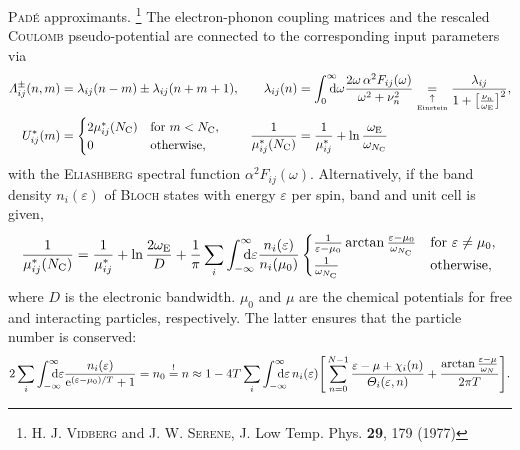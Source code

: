 \documentclass[a4paper]{article}
\def\D{\mathrm d}
\def\E{\mathrm e}
\def\sub#1{\sb{\mathrm{#1}}}
\def\from#1{\sb{\mathrlap{#1}}}
\def\till#1{\sp{\mathrlap{#1}}}
\let\epsilon\varepsilon
\let\Lambda\varLambda
\let\Theta\varTheta
\begin{document}
   \textsc{Padé} approximants.%
   \footnote{%
      H. J. \textsc{Vidberg} and J. W. \textsc{Serene}, J. Low Temp. Phys.
      \textbf{29}, 179 (1977)
      }
   The electron-phonon coupling matrices and the rescaled \textsc{Coulomb}
   pseudo-potential are connected to the corresponding input parameters via
   \begin{align*}
      \Lambda_{i j}^\pm(n, m) &=
      \lambda_{i j}(n - m) \pm \lambda_{i j}(n + m + 1),
      &
      \lambda_{i j}(n) &=
      \int \from 0 \till \infty \D \omega
      \frac{2 \omega \, \alpha^2 F_{i j}(\omega)}{\omega^2 + \nu_n^2}
      \underset {\underset{\text{Einstein}}\uparrow} =
      \frac{\lambda_{i j}}{1 + \big[ \frac{\nu_n}{\omega \sub E} \big]^2},
      \\
      U^*_{i j}(m) &=
      \begin{cases}
         2 \mu^*_{i j}(N \sub C) & \text{for $m < N \sub C$,} \\
         0                       & \text{otherwise,}
      \end{cases}
      &
      \frac 1 {\mu^*_{i j}(N \sub C)} &=
      \frac 1 {\mu^*_{i j}} + \ln \frac{\omega \sub E}{\omega_{N \sub C}}
   \end{align*}
   with the \textsc{Eliashberg} spectral function $\alpha^2 F_{i j}(\omega)$.
   Alternatively, if the band density $n_i(\epsilon)$ of \textsc{Bloch} states
   with energy $\epsilon$ per spin, band and unit cell is given,
   \begin{equation*}
       \frac 1 {\mu^*_{i j}(N \sub C)} =
       \frac 1 {\mu^*_{i j}} + \ln \frac {2 \omega \sub E} D +
       \frac 1 \pi \sum_i \int \from{-\infty} \till \infty \D \epsilon
       \frac{n_i(\epsilon)}{n_i(\mu_0)}
       \begin{cases}
           \frac 1 {\epsilon - \mu_0}
           \arctan \frac{\epsilon - \mu_0}{\omega_{N \sub C}}
               & \text{for $\epsilon \neq \mu_0$,} \\
           \frac 1 {\omega_{N \sub C}}
               & \text{otherwise,}
       \end{cases}
   \end{equation*}
   where $D$ is the electronic bandwidth. $\mu_0$ and $\mu$ are the chemical
   potentials for free and interacting particles, respectively. The latter
   ensures that the particle number is conserved:
   \begin{equation*}
      2 \sum_i \int \from{-\infty} \till \infty \D \epsilon
      \frac{n_i(\epsilon)}{\E^{(\epsilon - \mu_0) / T} + 1}
      = n_0 \overset ! = n
      \approx 1 - 4 T \sum_i \int \from{-\infty} \till \infty \D \epsilon \,
      n_i(\epsilon)
      \Bigg[
         \sum_{n = 0}^{N - 1}
         \frac{\epsilon - \mu + \chi_i(n)}{\Theta_i(\epsilon, n)}
         + \frac{\arctan \frac{\epsilon - \mu}{\omega_N}}{2 \pi T}
      \Bigg].
   \end{equation*}
\end{document}
